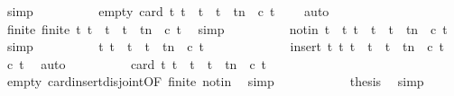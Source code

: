 \begin{isabellebody}
\ simp\isanewline
\ \ \ \ \ \ \ \ \isamarkupfalse%
\ empty{\isacharcolon}\ {\isacartoucheopen}card\ {\isacharbraceleft}t{\isacharprime}{\isachardot}\ t\ {\isacharless}\ t{\isacharprime}\ {\isasymand}\ t{\isacharprime}\ {\isasymle}\ t{\isacharplus}n\ {\isasymand}\ c\ t{\isacharprime}{\isacharbraceright}\ {\isacharequal}\ {}{\isacartoucheclose}\ \isamarkupfalse%
\ auto\isanewline
\ \ \ \ \ \ \ \ \isamarkupfalse%
\ finite{\isacharcolon}\ {\isacartoucheopen}finite\ {\isacharbraceleft}t{\isacharprime}{\isachardot}\ t\ {\isacharless}\ t{\isacharprime}\ {\isasymand}\ t{\isacharprime}\ {\isasymle}\ t{\isacharplus}n\ {\isasymand}\ c\ t{\isacharprime}{\isacharbraceright}{\isacartoucheclose}\ \isamarkupfalse%
\ simp\isanewline
\ \ \ \ \ \ \ \ \isamarkupfalse%
\ notin{\isacharcolon}\ {\isacartoucheopen}t\ {\isasymnotin}\ {\isacharbraceleft}t{\isacharprime}{\isachardot}\ t\ {\isacharless}\ t{\isacharprime}\ {\isasymand}\ t{\isacharprime}\ {\isasymle}\ t{\isacharplus}n\ {\isasymand}\ c\ t{\isacharprime}{\isacharbraceright}{\isacartoucheclose}\ \isamarkupfalse%
\ simp\isanewline
\ \ \ \ \ \ \ \ \isamarkupfalse%
\ {\isacartoucheopen}{\isacharbraceleft}t{\isacharprime}{\isachardot}\ t\ {\isasymle}\ t{\isacharprime}\ {\isasymand}\ t{\isacharprime}\ {\isasymle}\ t{\isacharplus}n\ {\isasymand}\ c\ t{\isacharprime}{\isacharbraceright}\isanewline
\ \ \ \ \ \ \ \ \ \ \ \ {\isacharequal}\ insert\ t\ {\isacharbraceleft}t{\isacharprime}{\isachardot}\ t\ {\isacharless}\ t{\isacharprime}\ {\isasymand}\ t{\isacharprime}\ {\isasymle}\ t{\isacharplus}n\ {\isasymand}\ c\ t{\isacharprime}{\isacharbraceright}{\isacartoucheclose}\ \isamarkupfalse%
\ {\isacartoucheopen}c\ t{\isacartoucheclose}\ \isamarkupfalse%
\ auto\isanewline
\ \ \ \ \ \ \ \ \isamarkupfalse%
\ {\isacartoucheopen}card\ {\isacharbraceleft}t{\isacharprime}{\isachardot}\ t\ {\isasymle}\ t{\isacharprime}\ {\isasymand}\ t{\isacharprime}\ {\isasymle}\ t{\isacharplus}n\ {\isasymand}\ c\ t{\isacharprime}{\isacharbraceright}\ {\isacharequal}\ {}{\isacartoucheclose}\isanewline
\ \ \ \ \ \ \ \ \ \ \isamarkupfalse%
\ empty\ card{\isacharunderscore}insert{\isacharunderscore}disjoint{\isacharbrackleft}OF\ finite\ notin{\isacharbrackright}\ \isamarkupfalse%
\ simp\isanewline
\ \ \ \ \ \ \ \ \isamarkupfalse%
\ \isamarkupfalse%
\ {\isacharquery}thesis\ \isamarkupfalse%
\ simp\isanewline

\end{isabellebody}
